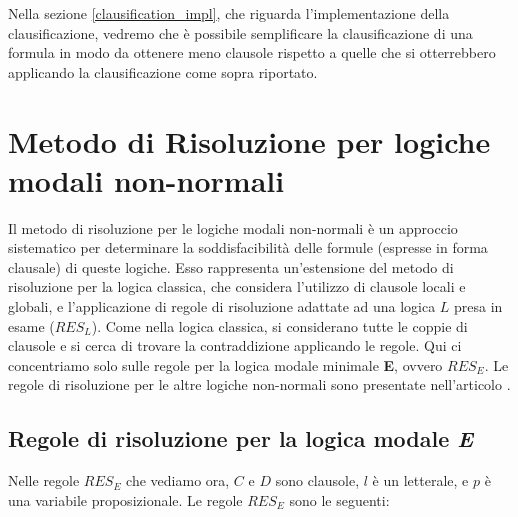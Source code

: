 \documentclass[a4paper,12pt]{report}
\begin{document}
Nella sezione \ref{clausification_impl}, che riguarda l'implementazione della clausificazione, vedremo che è possibile semplificare la clausificazione di una formula in modo da ottenere meno clausole rispetto a quelle che si otterrebbero applicando la clausificazione come sopra riportato.

\section{Metodo di Risoluzione per logiche modali non-normali}
Il metodo di risoluzione per le logiche modali non-normali è un approccio sistematico per determinare la soddisfacibilità delle formule (espresse in forma clausale) di queste logiche. Esso rappresenta un'estensione del metodo di risoluzione per la logica classica, che considera l'utilizzo di clausole locali e globali, e l'applicazione di regole di risoluzione adattate ad una logica $L$ presa in esame ($RES_L$). Come nella logica classica, si considerano tutte le coppie di clausole e si cerca di trovare la contraddizione applicando le regole. Qui ci concentriamo solo sulle regole per la logica modale minimale \textbf{E}, ovvero $RES_E$. Le regole di risoluzione per le altre logiche non-normali sono presentate nell'articolo \cite{Articolo_resolution}.

\subsection{Regole di risoluzione per la logica modale \emph{E}}
Nelle regole $RES_E$ che vediamo ora, $C$ e $D$ sono clausole, $l$ è un letterale, e $p$ è una variabile proposizionale. Le regole $RES_E$ sono le seguenti:




    
\end{document}
